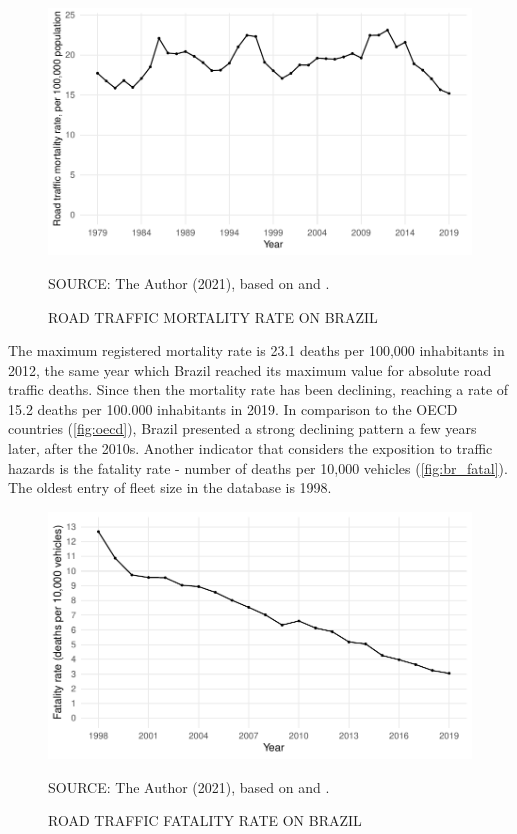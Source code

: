 
\begin{figure}[!htbp]
    \centering\footnotesize
    \captionsetup{font=footnotesize}
    \caption{ROAD TRAFFIC MORTALITY RATE ON BRAZIL}
    \includegraphics{fig/brazil_mort.pdf}
    \label{fig:br_mort}
    \par SOURCE: The Author (2021), based on \textcite{MinistryofHealth2020} and \textcite{MinistryofHealth2021}.
\end{figure}

The maximum registered mortality rate is 23.1 deaths per 100,000 inhabitants in 2012, the same year which Brazil reached its maximum value for absolute road traffic deaths. Since then the mortality rate has been declining, reaching a rate of 15.2 deaths per 100.000 inhabitants in 2019. In comparison to the OECD countries (\autoref{fig:oecd}), Brazil presented a strong declining pattern a few years later, after the 2010s. Another indicator that considers the exposition to traffic hazards is the fatality rate - number of deaths per 10,000 vehicles (\autoref{fig:br_fatal}). The oldest entry of fleet size in the \textcite{DENATRAN2020} database is 1998.

\begin{figure}[!htbp]
    \centering\footnotesize
    \captionsetup{font=footnotesize}
    \caption{ROAD TRAFFIC FATALITY RATE ON BRAZIL}
    \includegraphics{fig/brazil_fatality.pdf}
    \label{fig:br_fatal}
    \par SOURCE: The Author (2021), based on \textcite{MinistryofHealth2020} and \textcite{DENATRAN2020}.
\end{figure}                                

